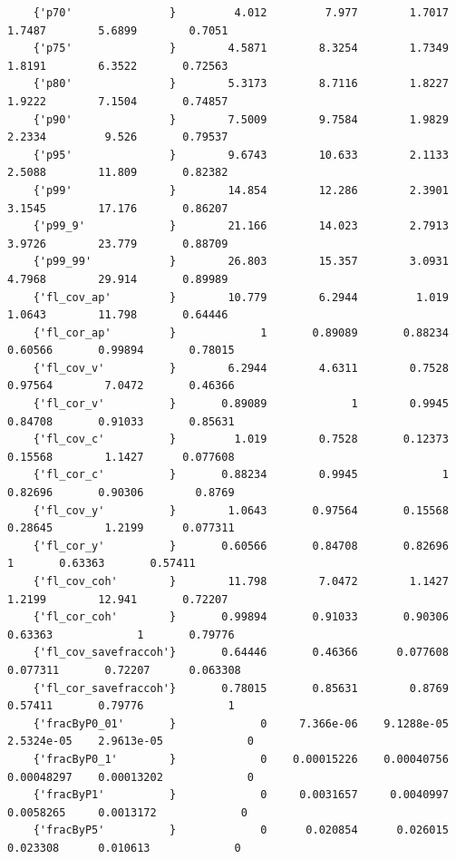 \documentclass[
]{book}
\begin{document}
\begin{verbatim}
    {'p70'               }         4.012         7.977        1.7017        1.7487        5.6899        0.7051 
    {'p75'               }        4.5871        8.3254        1.7349        1.8191        6.3522       0.72563 
    {'p80'               }        5.3173        8.7116        1.8227        1.9222        7.1504       0.74857 
    {'p90'               }        7.5009        9.7584        1.9829        2.2334         9.526       0.79537 
    {'p95'               }        9.6743        10.633        2.1133        2.5088        11.809       0.82382 
    {'p99'               }        14.854        12.286        2.3901        3.1545        17.176       0.86207 
    {'p99_9'             }        21.166        14.023        2.7913        3.9726        23.779       0.88709 
    {'p99_99'            }        26.803        15.357        3.0931        4.7968        29.914       0.89989 
    {'fl_cov_ap'         }        10.779        6.2944         1.019        1.0643        11.798       0.64446 
    {'fl_cor_ap'         }             1       0.89089       0.88234       0.60566       0.99894       0.78015 
    {'fl_cov_v'          }        6.2944        4.6311        0.7528       0.97564        7.0472       0.46366 
    {'fl_cor_v'          }       0.89089             1        0.9945       0.84708       0.91033       0.85631 
    {'fl_cov_c'          }         1.019        0.7528       0.12373       0.15568        1.1427      0.077608 
    {'fl_cor_c'          }       0.88234        0.9945             1       0.82696       0.90306        0.8769 
    {'fl_cov_y'          }        1.0643       0.97564       0.15568       0.28645        1.2199      0.077311 
    {'fl_cor_y'          }       0.60566       0.84708       0.82696             1       0.63363       0.57411 
    {'fl_cov_coh'        }        11.798        7.0472        1.1427        1.2199        12.941       0.72207 
    {'fl_cor_coh'        }       0.99894       0.91033       0.90306       0.63363             1       0.79776 
    {'fl_cov_savefraccoh'}       0.64446       0.46366      0.077608      0.077311       0.72207      0.063308 
    {'fl_cor_savefraccoh'}       0.78015       0.85631        0.8769       0.57411       0.79776             1 
    {'fracByP0_01'       }             0     7.366e-06    9.1288e-05    2.5324e-05    2.9613e-05             0 
    {'fracByP0_1'        }             0    0.00015226    0.00040756    0.00048297    0.00013202             0 
    {'fracByP1'          }             0     0.0031657     0.0040997     0.0058265     0.0013172             0 
    {'fracByP5'          }             0      0.020854      0.026015      0.023308      0.010613             0 

\end{verbatim}
\end{document}
